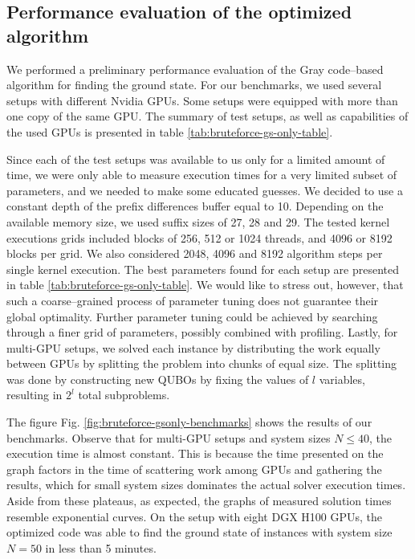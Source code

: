 \subsection{Performance evaluation of the optimized algorithm}

We performed a preliminary performance evaluation of the Gray code--based algorithm for finding the ground state. For our benchmarks, we used several setups with different Nvidia GPUs. Some setups were equipped with more than one copy of the same GPU. The summary of test setups, as well as capabilities of the used GPUs is presented in table \ref{tab:bruteforce-gs-only-table}.

Since each of the test setups was available to us only for a limited amount of time, we were only able to measure
execution times for a very limited subset of parameters, and we needed to make some educated guesses. We decided to
use a constant depth of the prefix differences buffer equal to 10. Depending on the available memory size, we used suffix sizes of 27, 28 and 29. The tested kernel executions grids included blocks of 256, 512 or 1024 threads, and 4096 or 8192 blocks per grid. We also considered 2048, 4096 and 8192 algorithm steps per single kernel execution. The best parameters found for each setup are presented in table \ref{tab:bruteforce-gs-only-table}. We would like to stress out,  however, that such a coarse--grained process of parameter tuning does not guarantee their global optimality. Further
parameter tuning could be achieved by searching through a finer grid of parameters, possibly combined with profiling.
Lastly, for multi-GPU setups, we solved each instance by distributing the work equally between GPUs by splitting the problem into chunks of equal size. The splitting was done by constructing new QUBOs by fixing the values of $l$ variables, resulting in $2^{l}$ total subproblems.

The figure Fig. \ref{fig:bruteforce-gsonly-benchmarks} shows the results of our benchmarks. Observe that for multi-GPU setups and system sizes $N \le 40$, the execution time is almost constant. This is because the time presented on the graph factors in the time of scattering work among GPUs and gathering the results, which for small system sizes dominates the actual solver execution times. Aside from these plateaus, as expected, the graphs of measured solution times
resemble exponential curves. On the setup with eight DGX H100 GPUs, the optimized code was able to find the ground state of instances with system size $N=50$ in less than 5 minutes.

